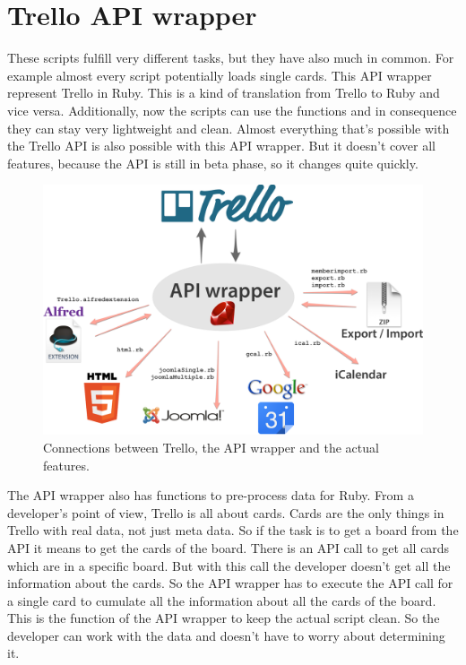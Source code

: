 
\chapter{Trello API wrapper}

These scripts fulfill very different tasks, but they have also much in common. For example almost every script potentially loads single cards. This API wrapper represent Trello in Ruby. This is a kind of translation from Trello to Ruby and vice versa. Additionally, now the scripts can use the functions and in consequence they can stay very lightweight and clean. Almost everything that's possible with the Trello API is also possible with this API wrapper. But it doesn't cover all features, because the API is still in beta phase, so it changes quite quickly.

\begin{figure}
\centering
\includegraphics[width=\textwidth]{figures/api-wrapper}
\caption{Connections between Trello, the API wrapper and the actual features. \cite{ruby:icon}\cite{html:logo}\cite{joomla}\cite{google} }
\label{fig: api-wrapper}
\end{figure}

The API wrapper also has functions to pre-process data for Ruby. From a developer's point of view, Trello is all about cards. Cards are the only things in Trello with real data, not just meta data. So if the task is to get a board from the API it means to get the cards of the board. There is an API call to get all cards which are in a specific board. But with this call the developer doesn't get all the information about the cards. So the API wrapper has to execute the API call for a single card to cumulate all the information about all the cards of the board. This is the function of the API wrapper to keep the actual script clean. So the developer can work with the data and doesn't have to worry about determining it.

